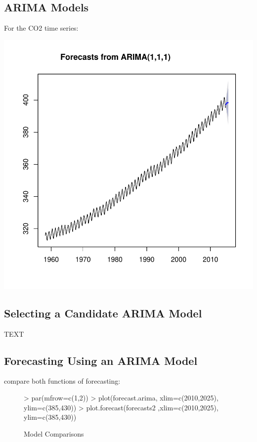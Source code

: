 \documentclass[11pt, a4paper]{article} %
\begin{document}
\subsection{ARIMA Models}%
For the CO2 time series:
\begin{Schunk}
\end{Schunk}
\includegraphics{alles-033}

\subsection{Selecting a Candidate ARIMA Model}%
TEXT
\subsection{Forecasting Using an ARIMA Model}%
compare both functions of forecasting:
\begin{figure}[H]
\centering
\begin{Schunk}
\begin{Sinput}
> par(mfrow=c(1,2))
> plot(forecast.arima, xlim=c(2010,2025), ylim=c(385,430))
> plot.forecast(forecasts2 ,xlim=c(2010,2025), ylim=c(385,430))
\end{Sinput}
\end{Schunk}
\caption{Model Comparisons}
\end{figure}
\end{document}
